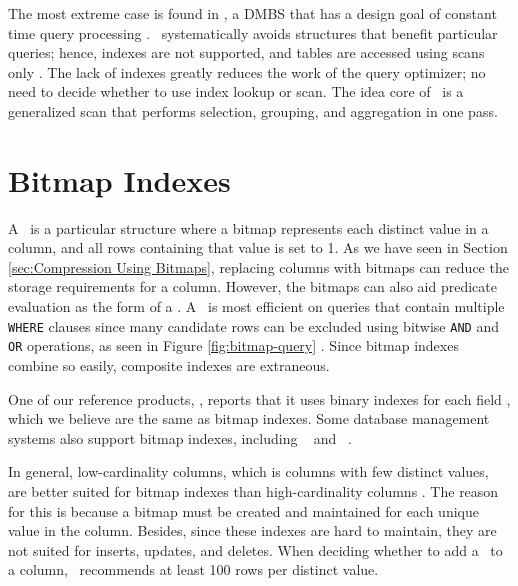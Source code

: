 The most extreme case is found in \blink, a DMBS that has a design goal of constant time query processing \cite{Raman2008-gi}. \blink~systematically avoids structures that benefit particular queries; hence, indexes are not supported, and tables are accessed using scans only \cite{Barber2012-xt}. The lack of indexes greatly reduces the work of the query optimizer; no need to decide whether to use index lookup or scan. The idea core of \blink~is a generalized scan that performs selection, grouping, and aggregation in one pass.

\section{Bitmap Indexes}
\label{sec:Bitmap Indexes}


A \biti~is a particular structure where a bitmap represents each distinct value in a column, and all rows containing that value is set to 1. As we have seen in Section \ref{sec:Compression Using Bitmaps}, replacing columns with bitmaps can reduce the storage requirements for a column. However, the bitmaps can also aid predicate evaluation as the form of a \biti. A \biti~is most efficient on queries that contain multiple \texttt{WHERE} clauses since many candidate rows can be excluded using bitwise \texttt{AND} and \texttt{OR} operations, as seen in Figure \ref{fig:bitmap-query} \cite{noauthor_undated-hp}. Since bitmap indexes combine so easily, composite indexes are extraneous. 

One of our reference products, \qlikview, reports that it uses binary indexes for each field \cite{Qlik2011-ef}, which we believe are the same as bitmap indexes. Some database management systems also support bitmap indexes, including \oracle~\cite{noauthor_undated-hp} and \ibm~\cite{Raman2013-em}.

In general, low-cardinality columns, which is columns with few distinct values, are better suited for bitmap indexes than high-cardinality columns \cite{noauthor_undated-hp}. The reason for this is because a bitmap must be created and maintained for each unique value in the column. Besides, since these indexes are hard to maintain, they are not suited for inserts, updates, and deletes. When deciding whether to add a \biti~to a column, \oracle~recommends at least 100 rows per distinct value. 


